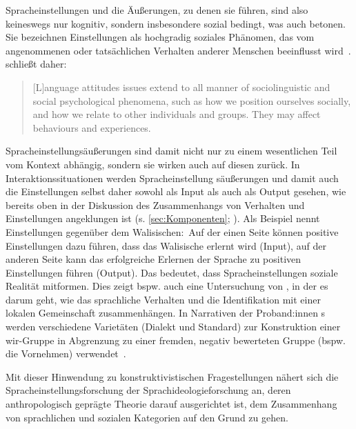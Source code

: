 Spracheinstellungen %
und die Äußerungen, zu denen sie führen, %
sind also keineswegs nur kognitiv, sondern insbesondere sozial bedingt, was auch \citet{Aronson.2014} betonen. 
Sie bezeichnen Einstellungen als {\glqq}hochgradig soziales Ph{\"a}nomen, das vom angenommenen oder tats{\"a}chlichen Verhalten anderer Menschen beeinflusst wird{\grqq}~\citep[223]{Aronson.2014}. 
\citet{Garrett.2012} schließt daher:
\begin{quote}[L]anguage attitudes issues extend to all manner of sociolinguistic and social psychological phenomena, such as how we position ourselves socially, and how we relate to other individuals and groups. They may affect behaviours and experiences.~\citep[15]{Garrett.2012}\end{quote}
Spracheinstellungsäußerungen sind damit nicht nur zu einem wesentlichen Teil vom Kontext abhängig, sondern sie wirken auch auf diesen zurück. 
In Interaktionssituationen werden Spracheinstellung%
säußerungen und damit auch die Einstellungen selbst %
daher sowohl als Input als auch als Output gesehen, wie bereits oben in der Diskussion des Zusammenhangs von Verhalten und Einstellungen angeklungen ist (s. \autoref{sec:Komponenten}; \citealp[400]{Lasagabaster.2005}). 
Als Beispiel nennt \citet[21]{Garrett.2012} Einstellungen gegen{\"u}ber dem Walisischen:~Auf der einen Seite k{\"o}nnen positive Einstellungen dazu f{\"u}hren, dass das Walisische erlernt wird (Input), auf der anderen Seite kann das erfolgreiche Erlernen der Sprache zu positiven Einstellungen f{\"u}hren (Output). 
Das bedeutet, dass Spracheinstellungen soziale Realität mitformen. 
Dies zeigt bspw. auch eine Untersuchung von \citet{Keim.1995}, in der es darum geht, wie das sprachliche Verhalten und die Identifikation mit einer lokalen Gemeinschaft zusammenhängen. 
In Narrativen der Proband:innen \citeauthor{Keim.1995}s werden verschiedene Variet{\"a}ten (Dialekt und Standard) zur Konstruktion einer wir-Gruppe in Abgrenzung zu einer fremden, negativ bewerteten Gruppe (bspw. die Vornehmen) verwendet~\citep[s.][170]{Keim.1995}.

Mit dieser Hinwendung zu konstruktivistischen Fragestellungen nähert sich die Spracheinstellungsforschung der Sprachideologieforschung an, deren anthropologisch geprägte Theorie darauf ausgerichtet ist, dem Zusammenhang von sprachlichen und sozialen Kategorien auf den Grund zu gehen. 
